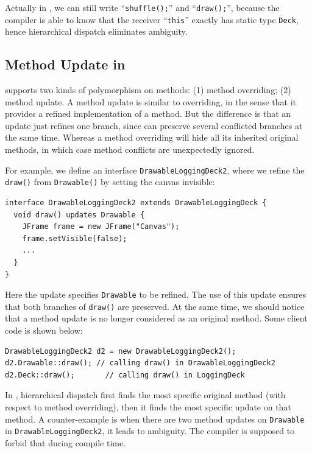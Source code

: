 Actually in \MIM{}, we can still write ``\lstinline|shuffle();|'' and ``\lstinline|draw();|'',
because the compiler is able to know that the receiver ``\lstinline|this|'' exactly has static type \lstinline|Deck|, hence hierarchical dispatch eliminates ambiguity.

\subsection{Method Update in \MIM	}

\MIM{} supports two kinds of polymorphism on methods: (1) method overriding; (2) method update. A method update is similar to overriding, in the sense that it provides a refined implementation of a method. But the difference is that an update just refines one branch, since \MIM{} can preserve several conflicted branches at the same time. Whereas a method overriding will hide all its inherited original methods, in which case method conflicts are unexpectedly ignored.

For example, we define an interface \lstinline|DrawableLoggingDeck2|, where we refine the \lstinline|draw()| from \lstinline|Drawable()| by setting
the canvas invisible:
\vspace{3pt}\begin{lstlisting}
interface DrawableLoggingDeck2 extends DrawableLoggingDeck {
  void draw() updates Drawable {
    JFrame frame = new JFrame("Canvas");
    frame.setVisible(false);
    ...
  }
}
\end{lstlisting}\vspace{3pt}
Here the update specifies \lstinline|Drawable| to be refined. The use of this update ensures that both branches of \lstinline|draw()| are preserved. At the same time, we should notice that a method update is no longer considered as an original method. Some client code is shown below:
\vspace{3pt}\begin{lstlisting}
DrawableLoggingDeck2 d2 = new DrawableLoggingDeck2();
d2.Drawable::draw(); // calling draw() in DrawableLoggingDeck2
d2.Deck::draw();       // calling draw() in LoggingDeck
\end{lstlisting}\vspace{3pt}

In \MIM{}, hierarchical dispatch first finds the most specific original method (with respect to method overriding), then it finds the most specific update on that method. A counter-example is when there are two method updates on \lstinline|Drawable| in \lstinline|DrawableLoggingDeck2|, it leads to ambiguity. The compiler is supposed to forbid that during compile time.

